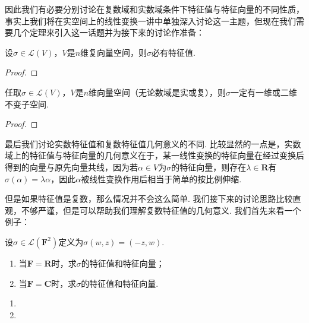 因此我们有必要分别讨论在复数域和实数域条件下特征值与特征向量的不同性质，事实上我们将在实空间上的线性变换一讲中单独深入讨论这一主题，但现在我们需要几个定理来引入这一话题并为接下来的讨论作准备：
\begin{theorem}\label{thm:18:复数域上的特征值}
    设$\sigma\in \mathcal{L}(V)$，$V$是$n$维复向量空间，则$\sigma$必有特征值.
\end{theorem}

\begin{proof}

\end{proof}

\begin{theorem}\label{thm:18:特征值与不变子空间}
    任取$\sigma\in \mathcal{L}(V)$，$V$是$n$维向量空间（无论数域是实或复），则$\sigma$一定有一维或二维不变子空间.
\end{theorem}

\begin{proof}

\end{proof}

最后我们讨论实数特征值和复数特征值几何意义的不同. 比较显然的一点是，实数域上的特征值与特征向量的几何意义在于，某一线性变换的特征向量在经过变换后得到的向量与原先向量共线，因为若$\alpha\in V$为$\sigma$的特征向量，则存在$\lambda\in\mathbf{R}$有$\sigma(\alpha)=\lambda\alpha$，因此$\alpha$被线性变换作用后相当于简单的按比例伸缩.

但是如果特征值是复数，那么情况并不会这么简单. 我们接下来的讨论思路比较直观，不够严谨，但是可以帮助我们理解复数特征值的几何意义. 我们首先来看一个例子：
\begin{example}
    设$\sigma\in\mathcal{L}(\mathbf{F}^2)$定义为$\sigma(w,z)=(-z,w)$.
    \begin{enumerate}
        \item 当$\mathbf{F}=\mathbf{R}$时，求$\sigma$的特征值和特征向量；

        \item 当$\mathbf{F}=\mathbf{C}$时，求$\sigma$的特征值和特征向量.
    \end{enumerate}
\end{example}

\begin{solution}
    \begin{enumerate}
        \item

        \item
    \end{enumerate}
\end{solution}

